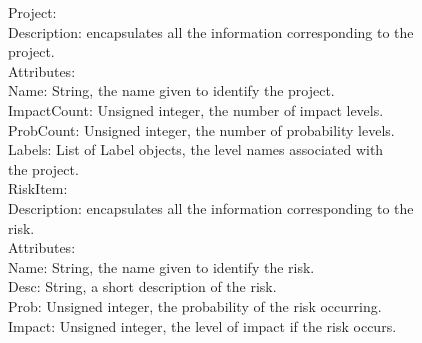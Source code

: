 \documentclass[letterpaper,12pt,oneside,listof=totoc,parskip=full]{scrreprt}
\begin{document}
Project: \\
\hspace* {1cm} Description: encapsulates all the information corresponding to the \\
\hspace*{1cm} project. \\
\hspace* {1cm} Attributes: \\
\hspace*{2cm} Name: String, the name given to identify the project. \\
\hspace*{2cm} ImpactCount: Unsigned integer, the number of impact levels. \\
\hspace*{2cm} ProbCount: Unsigned integer, the number of probability levels. \\
\hspace*{2cm} Labels: List of Label objects, the level names associated with \\
\hspace*{2cm} the project. \\



RiskItem: \\
\hspace* {1cm} Description: encapsulates all the information corresponding to the \\
\hspace*{1cm} risk. \\
\hspace* {1cm} Attributes: \\
\hspace*{2cm} Name: String, the name given to identify the risk. \\
\hspace*{2cm} Desc: String, a short description of the risk. \\
\hspace*{2cm} Prob: Unsigned integer, the probability of the risk occurring.\\
\hspace*{2cm} Impact: Unsigned integer, the level of impact if the risk occurs.\\ 
\end{document}
